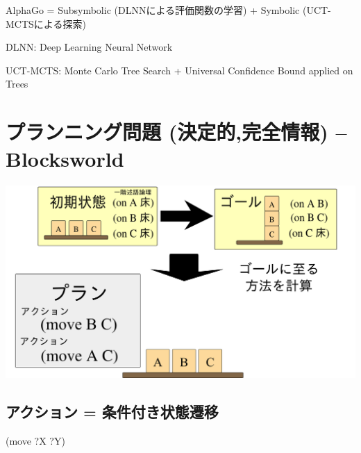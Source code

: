 \begin{alignright}
AlphaGo = Subsymbolic (DLNNによる評価関数の学習) + Symbolic (UCT-MCTSによる探索)
\end{alignright}

\begin{note}
DLNN: Deep Learning Neural Network

UCT-MCTS: Monte Carlo Tree Search + Universal Confidence Bound applied on Trees
\end{note}

\section{プランニング問題 (決定的,完全情報) -- Blocksworld}
\label{sec-5}

\includegraphics{img/plan.png}

\subsection{アクション = 条件付き状態遷移}
\label{sec-5-1}

\begin{center}
\begin{xlarge}
(move ?X ?Y)
\end{xlarge}
\end{center}


